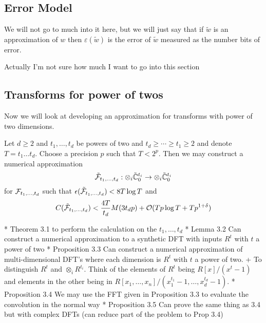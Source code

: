 \subsection{Error Model}

We will not go to much into it here, but we will just say that if $\tilde{w}$ is an approximation of $w$ then $\varepsilon(\tilde{w})$ is the error of $\tilde{w}$ measured as the number bits of error.

Actually I'm not sure how much I want to go into this section

\subsection{Transforms for power of twos}

Now we will look at developing an approximation for transforms with power of two dimensions.

\begin{theorem}
    Let $d \geq 2$ and $t_1, \ldots, t_d$ be powers of two and $t_d \geq \cdots \geq t_1 \geq 2$ and denote $T = t_1 \ldots t_d$. Choose a precision $p$ such that $T < 2^p$. Then we may construct a numerical approximation
    \[
        \tilde {\mathcal F}_{t_1, \ldots, t_d} : \otimes_i \tilde{{\mathbb C}}^{t_i}_0 \to \otimes_i \tilde{{\mathbb C}}^{t_i}_0
    \]
    for $\mathcal F_{t_1, \ldots, t_d}$ such that $\epsilon(\tilde{\mathcal F}_{t_1, \ldots, t_d}) < 8 T \log T$ and
    \[
        C(\tilde{\mathcal F}_{t_1, \ldots, t_d}) < \frac{4T}{t_d} M(3t_d p) + \mathcal O(Tp\log T + Tp^{1 + \delta})
    \]
\end{theorem}




* Theorem 3.1 to perform the calculation on the $t_1, \ldots, t_d$
* Lemma 3.2 Can construct a numerical approximation to a synthetic DFT with inputs $R^t$ with $t$ a power of two
* Proposition 3.3 Can construct a numerical approximation of multi-dimensional DFT's where each dimension is $R^t$ with $t$ a power of two.
    + To distinguish $R^t$ and $\otimes_i R^{t_i}$. Think of the elements of $R^t$ being $R[x]/(x^t - 1)$ and elements in the other being in $R[x_1, \ldots, x_n]/(x_1^{t_1} - 1, \ldots, x_d^{t_d} - 1)$.
* Proposition 3.4 We may use the FFT given in Proposition 3.3 to evaluate the convolution in the normal way
* Proposition 3.5 Can prove the same thing as 3.4 but with complex DFTs (can reduce part of the problem to Prop 3.4)





